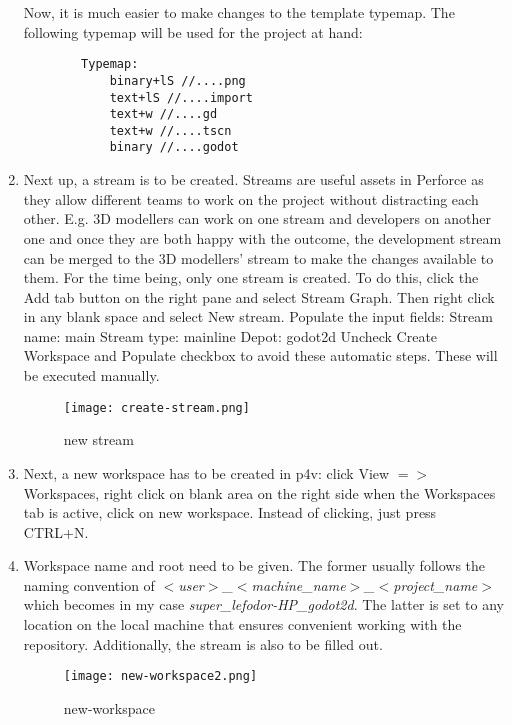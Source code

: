 \begin{enumerate}
\begin{verbatim}
    \end{verbatim}
    Now, it is much easier to make changes to the template typemap.
    The following typemap will be used for the project at hand:
    \begin{verbatim}
        Typemap:
            binary+lS //....png
            text+lS //....import
            text+w //....gd
            text+w //....tscn
            binary //....godot
    \end{verbatim}
    \item Next up, a stream is to be created. Streams are useful assets in Perforce as they allow different
    teams to work on the project without distracting each other. E.g. 3D modellers can work on one stream and developers 
    on another one and once they are both happy with the outcome, the development stream can be merged to the 3D modellers'
    stream to make the changes available to them. For the time being, only one stream is created.
    To do this, click the Add tab button on the right pane and select Stream Graph. Then right click in any blank space
    and select New stream. Populate the input fields: \hfill \break
    Stream name: main \hfill \break
    Stream type: mainline \hfill \break
    Depot: godot2d \hfill \break
    Uncheck Create Workspace and Populate checkbox to avoid these automatic steps. These will be executed manually.
    \begin{figure}[H]
        \centering
        \texttt{[image: create-stream.png]}
        \caption{new stream}
        \label{fig:new-stream}
    \end{figure}
    \item Next, a new workspace has to be created in p4v: click View {$=>$} Workspaces, right click on blank area on the
    right side when the Workspaces tab is active, click on new workspace. Instead of clicking, just press CTRL+N.
    \item Workspace name and root need to be given. The former usually follows the naming convention of 
    \textit{$<$user$>$\_$<$machine\_name$>$\_$<$project\_name$>$} which becomes in my case 
    \textit{super\_lefodor-HP\_godot2d}. The latter is set to any location on the local machine that ensures convenient
    working with the repository. Additionally, the stream is also to be filled out.
    \begin{figure}[H]
        \centering
        \texttt{[image: new-workspace2.png]}
        \caption{new-workspace}
        \label{fig:new-workspace}

\end{figure}
\end{enumerate}
